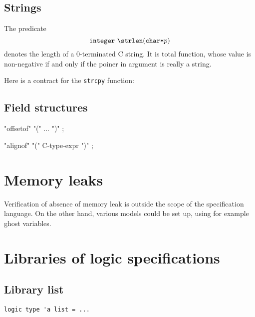 \subsection{Strings}

\experimental

The predicate 
\[
\integer~\strlen(\verb|char*|p)
\]
denotes the length of a 0-terminated C string. It is total function,
whose value is non-negative if and only if the poiner in argument is
really a string.

\begin{example}
  Here is a contract for the \verb|strcpy| function:
  

\end{example}

\subsection{Field structures}

 "offsetof" "(" ... ")" ; \experimental

 "alignof" "(" C-type-expr ")" ; \experimental

\section{Memory leaks}

\experimental

Verification of absence of memory leak is outside the scope of the
specification language. On the other hand, various models could be set
up, using for example ghost variables.

\section{Libraries of logic specifications}
\label{sec:speclibraries}

\subsection{Library list}

\begin{verbatim}
logic type 'a list = ...
\end{verbatim}

